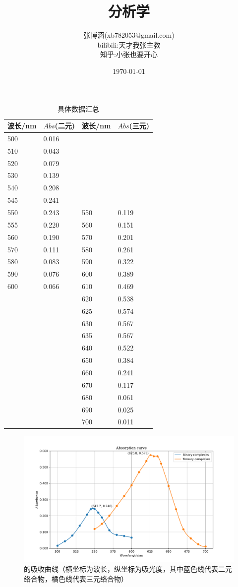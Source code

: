 \documentclass[UTF8,AutoFakeBold,a4paper]{ctexbook}
\title{\kaishu\textbf {分析学}}
\author{\kaishu 张博涵(xb782053@gmail.com)\\
\kaishu bilibili:天才我张主教\\
\kaishu 知乎:小张也要开心}
\date{\kaishu \today}
\begin{document}
\begin{table}
    \centering
     \begin{tabular}{p{ 2.5cm}<{\centering} p{ 2.5cm}<{\centering} p{ 2.5cm}<{\centering} p{ 2.5cm}<{\centering}}
		\toprule
        波长/nm & $Abs$(二元) &波长/nm & $Abs$(三元) \\
        \midrule
      500 & 0.016 &  &  \\  
        510 & 0.043 &  &  \\  
        520 & 0.079 &  &  \\  
        530 & 0.139 &  &  \\  
        540 & 0.208 &  &  \\  
        545 & 0.241 &  &  \\  
        550 & 0.243 & 550 & 0.119 \\  
        555 & 0.220 & 560 & 0.151 \\  
        560 & 0.190 & 570 & 0.201 \\  
        570 & 0.111 & 580 & 0.261 \\  
        580 & 0.083 & 590 & 0.322 \\  
        590 & 0.076 & 600 & 0.389 \\  
        600 & 0.066 & 610 & 0.469 \\  
         &  & 620 & 0.538 \\  
         &  & 625 & 0.574 \\  
         &  & 630 & 0.567 \\  
         &  & 635 & 0.567 \\  
         &  & 640 & 0.522 \\  
         &  & 650 & 0.384 \\  
         &  & 660 & 0.241 \\  
         &  & 670 & 0.117 \\  
         &  & 680 & 0.061 \\  
         &  & 690 & 0.025 \\  
         &  & 700 & 0.011 \\  
         \bottomrule
    \end{tabular}
    \caption{具体数据汇总}
\end{table}
\begin{figure}[h]
 	\centering
	\includegraphics[scale=0.6]{CAS}
	\caption[scale=0.6]{的吸收曲线（{\kaishu 横坐标为波长，纵坐标为吸光度，其中蓝色线代表二元络合物，橘色线代表三元络合物}）}
 \end{figure}
\end{document}
